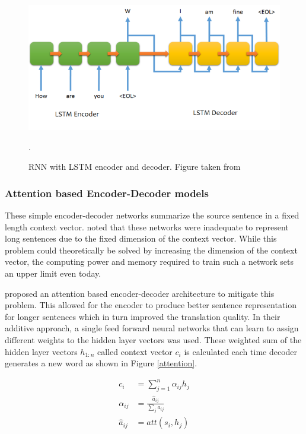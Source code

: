 \begin{figure}[ht]
	\centering
	\includegraphics[scale=0.9]{images/seq2seq}
	\caption{RNN with LSTM encoder and decoder. Figure taken from \cite{farizrahman4u}}.
	\label{seq2seq}
\end{figure}


\subsubsection{Attention based Encoder-Decoder models}

These simple encoder-decoder networks summarize the source sentence in a fixed length context vector. \cite{bahdanau2014neural} noted that these networks were inadequate to represent long sentences due to the fixed dimension of the context vector. While this problem could theoretically be solved by increasing the dimension of the context vector, the computing power and memory required to train such a network sets an upper limit even today.

\cite{bahdanau2014neural} proposed an attention based encoder-decoder architecture to mitigate this problem.  This allowed for the encoder to produce better sentence representation for longer sentences which in turn improved the translation quality. In their additive approach, a single feed forward neural networks that can learn to assign different weights to the hidden layer vectors was used. These weighted sum of the hidden layer vectors $h_{1:n}$ called context vector $c_i$ is calculated each time decoder generates a new word as shown in Figure \ref{attention}.

\begin{align}
c_i &= \sum_{j=1}^{n} \alpha_{ij} h_j \\
\alpha_{ij} &= \frac{\hat{a}_{ij}}{\sum_j \hat{a}_{ij}}\\
\hat{a}_{ij} &= att(s_i, h_j)
\end{align}



